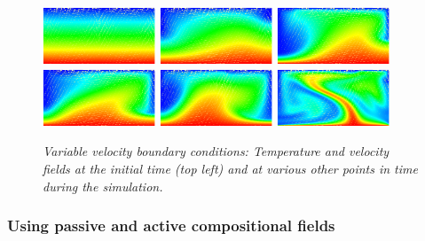 \documentclass{article}
\begin{document}
\begin{figure}
  \centering
  \includegraphics[width=0.3\textwidth]{cookbooks/platelike-boundary/doc/visit0000.png}
  \hfill
  \includegraphics[width=0.3\textwidth]{cookbooks/platelike-boundary/doc/visit0001.png}
  \hfill
  \includegraphics[width=0.3\textwidth]{cookbooks/platelike-boundary/doc/visit0003.png}
  \\
  \includegraphics[width=0.3\textwidth]{cookbooks/platelike-boundary/doc/visit0004.png}
  \hfill
  \includegraphics[width=0.3\textwidth]{cookbooks/platelike-boundary/doc/visit0005.png}
  \hfill
  \includegraphics[width=0.3\textwidth]{cookbooks/platelike-boundary/doc/visit0006.png}
  \caption{\it Variable velocity boundary conditions: Temperature and velocity
  fields at the initial time (top left) and at various other points in time during the
  simulation.}
  \label{fig:platelike}
\end{figure}


\subsubsection{Using passive and active compositional fields}
\label{sec:cookbooks-composition}
\end{document}
